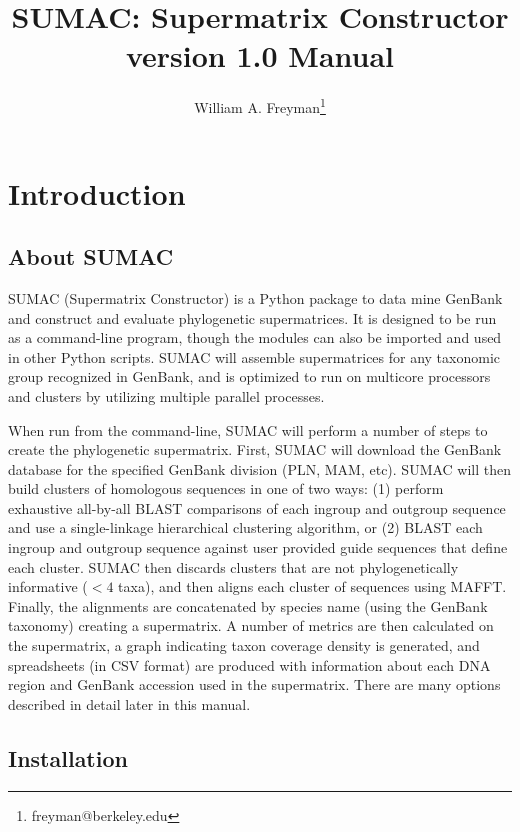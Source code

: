 \documentclass[10pt]{report}
\title{SUMAC: Supermatrix Constructor version 1.0 Manual}
\author{William A. Freyman\thanks{freyman@berkeley.edu}}
\affil{Department of Integrative Biology, University of California, Berkeley}
\date{}
\begin{document}
\maketitle

\tableofcontents


\chapter{Introduction}

\section{About SUMAC}

SUMAC (Supermatrix Constructor) is a Python package to 
data mine GenBank and construct
and evaluate phylogenetic supermatrices. 
It is designed to be run as a command-line program, though
the modules can also be imported and used in other Python scripts.
SUMAC will assemble
supermatrices for any taxonomic group recognized in GenBank,
and is optimized to run on multicore processors and clusters by utilizing multiple parallel processes.

When run from the command-line, SUMAC will perform a number of steps to create
the phylogenetic supermatrix. 
First, SUMAC will download the GenBank database for the specified GenBank division (PLN, MAM, etc).
SUMAC will then build clusters of homologous sequences in one of two ways:
(1) perform exhaustive all-by-all BLAST comparisons of each ingroup and outgroup sequence
and use a single-linkage hierarchical clustering algorithm, or
(2) BLAST each ingroup and outgroup sequence against user provided guide sequences
that define each cluster.
SUMAC then discards clusters that are not phylogenetically informative ($< 4$ taxa), 
and then aligns each cluster of sequences using MAFFT.
Finally, the alignments are concatenated by species name (using the GenBank taxonomy) 
creating a supermatrix. A number of metrics are then calculated on the supermatrix, 
a graph indicating taxon coverage density is generated, and spreadsheets (in CSV format)
are produced with information about each DNA region and GenBank accession used in 
the supermatrix. 
There are many options described in
detail later in this manual. 


\section{Installation}
\end{document}
